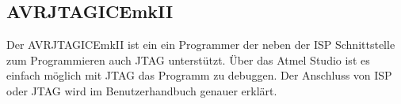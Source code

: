 \subsection{AVRJTAGICEmkII}

Der AVRJTAGICEmkII ist ein ein Programmer der neben der \ac{ISP} Schnittstelle
zum Programmieren auch \ac{JTAG} unterstützt. Über das Atmel Studio ist es
einfach möglich mit \ac{JTAG} das Programm zu debuggen.
Der Anschluss von ISP oder JTAG wird im Benutzerhandbuch genauer erklärt.
